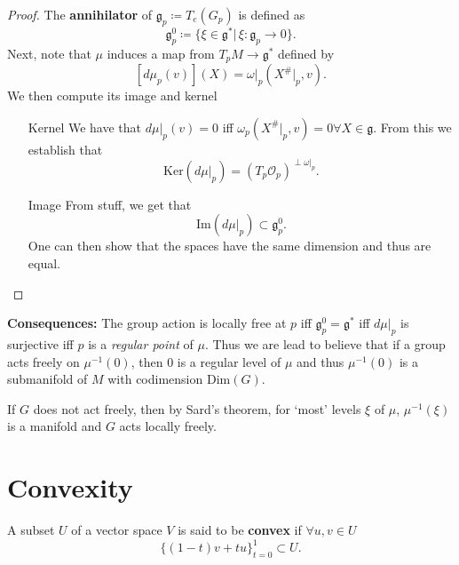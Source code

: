 \documentclass[11pt, final]{article}
\begin{document}
\begin{proof}
The \textbf{annihilator} of $\mathfrak{g}_p \coloneqq T_e(G_p)$ is defined as
	\begin{equation}
		\mathfrak{g}_p^0 \coloneqq \{ \xi \in \mathfrak{g}^* | \, \xi: \mathfrak{g}_p \to 0 \}.
	\end{equation}
Next, note that $\mu$ induces a map from $T_pM \to \mathfrak{g}^*$ defined by
	\begin{equation}
		\left[ d\mu_p(v) \right] (X) = \omega|_p\left(X^\#|_p, v \right).
	\end{equation}
We then compute its image and kernel
	\begin{itemize}
		\item[Kernel] We have that $d\mu|_p (v) = 0$ iff $\omega_p(X^\#|_p , v) = 0 \forall X \in \mathfrak{g}$. From this we establish that
			\begin{equation}
				\mathrm{Ker} (d\mu|_p) = (T_p \mathcal{O}_p)^{\perp \omega|_p}.
			\end{equation}
		
		\item[Image] From stuff, we get that
			\begin{equation}
				\mathrm{Im} (d\mu|_p) \subset \mathfrak{g}^0_p.
			\end{equation}
		One can then show that the spaces have the same dimension and thus are equal.
	\end{itemize}
\end{proof}

\begin{remark} \textbf{Consequences:}
	The group action is locally free at $p$ iff $\mathfrak{g}^0_p = \mathfrak{g}^*$ iff $d\mu|_p$ is surjective iff $p$ is a \textit{regular point} of $\mu$. Thus we are lead to believe that if a group acts freely on $\mu^{-1}(0)$, then $0$ is a regular level of $\mu$ and thus $\mu^{-1}(0)$ is a submanifold of $M$ with codimension $\mathrm{Dim}(G)$.
	
	If $G$ does not act freely, then by Sard's theorem, for `most' levels $\xi$ of $\mu$, $\mu^{-1}(\xi)$ is a manifold and $G$ acts locally freely.
\end{remark}

\section{Convexity}

\begin{definition}[Convex]
	A subset $U$ of a vector space $V$ is said to be \textbf{convex} if $\forall u,v \in U$
		\begin{equation*}
			\{ (1-t)v +t u \}_{t=0}^1 \subset U.
		\end{equation*}
\end{definition}
\end{document}
